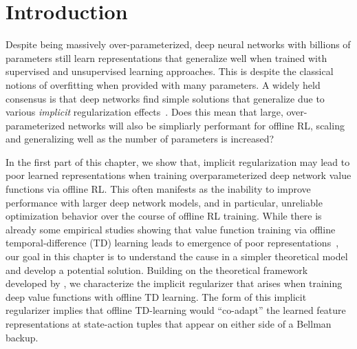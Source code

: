 \vspace{-0.2cm}
\section{Introduction}
\vspace{-0.2cm}

Despite being massively over-parameterized, deep neural networks with billions of parameters still learn representations that generalize well when trained with supervised and unsupervised learning approaches. This is despite the classical notions of overfitting when provided with many parameters. A widely held consensus is that deep networks find simple solutions that generalize due to various \emph{implicit} regularization effects~\citep{blanc2020implicit,woodworth2020kernel,arora2018optimization,gunasekar2017implicit,wei2019regularization,li2019towards}. Does this mean that large, over-parameterized networks will also be simpliarly performant for offline RL, scaling and generalizing well as the number of parameters is increased?

In the first part of this chapter, we show that, implicit regularization may lead to poor learned representations when training overparameterized deep network value functions via offline RL. This often manifests as the inability to improve performance with larger deep network models, and in particular, unreliable optimization behavior over the course of offline RL training. While there is already some empirical studies showing that value function training via offline temporal-difference (TD) learning leads to emergence of poor representations~\citep{kumar2021implicit}, our goal in this chapter is to understand the cause in a simpler theoretical model and develop a potential solution. Building on the theoretical framework developed by \citet{blanc2020implicit,damian2021label}, we characterize the implicit regularizer that arises when training deep value functions with offline TD learning. The form of this implicit regularizer implies that offline TD-learning would ``co-adapt'' the learned feature representations at state-action tuples that appear on either side of a Bellman backup.

